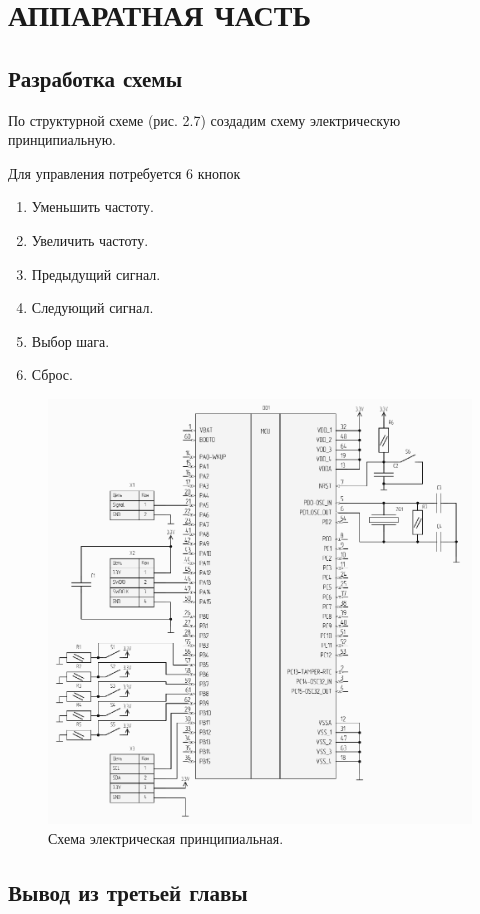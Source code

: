 \chapter{АППАРАТНАЯ ЧАСТЬ}
\section{Разработка схемы}
	По структурной схеме (рис. 2.7) создадим схему электрическую принципиальную. 
	
	Для управления потребуется 6 кнопок
	\begin{enumerate}
		\item Уменьшить частоту.
		\item Увеличить частоту.
		\item Предыдущий сигнал.
		\item Следующий сигнал.
		\item Выбор шага.
		\item Сброс.
	\end{enumerate}
	
	
	
	
\begin{figure}[H]
    \centering
    \includegraphics[width=1\textwidth]{../image/scheme-cropped.pdf}
    \caption{Схема электрическая принципиальная.}
\end{figure}

\section{Вывод из третьей главы}